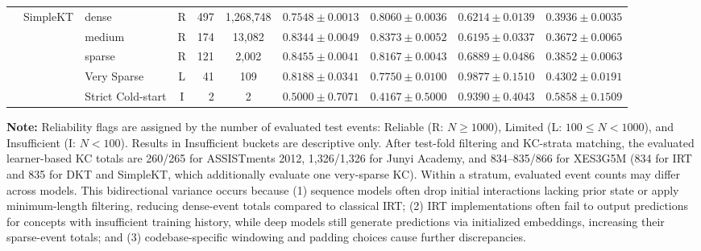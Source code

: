\begin{table}[tbp]
{\begin{tabular}{lllcrccccc}
 & SimpleKT & dense & R & 497 & 1,268,748 & $0.7548 \pm 0.0013$ & $0.8060 \pm 0.0036$ & $0.6214 \pm 0.0139$ & $0.3936 \pm 0.0035$ \\
 &  & medium & R & 174 & 13,082 & $0.8344 \pm 0.0049$ & $0.8373 \pm 0.0052$ & $0.6195 \pm 0.0337$ & $0.3672 \pm 0.0065$ \\
 &  & sparse & R & 121 & 2,002 & $0.8455 \pm 0.0041$ & $0.8167 \pm 0.0043$ & $0.6889 \pm 0.0486$ & $0.3852 \pm 0.0063$ \\
 &  & Very Sparse & L & 41 & 109 & $0.8188 \pm 0.0341$ & $0.7750 \pm 0.0100$ & $0.9877 \pm 0.1510$ & $0.4302 \pm 0.0191$ \\
 &  & Strict Cold-start & I & 2 & 2 & $0.5000 \pm 0.7071$ & $0.4167 \pm 0.5000$ & $0.9390 \pm 0.4043$ & $0.5858 \pm 0.1509$ \\
\bottomrule

\end{tabular}%
}

\vspace{1ex}
{\scriptsize \textbf{Note:} Reliability flags are assigned by the number of evaluated test events: Reliable (R: $N \ge 1000$), Limited (L: $100 \le N < 1000$), and Insufficient (I: $N < 100$). Results in Insufficient buckets are descriptive only. After test-fold filtering and KC-strata matching, the evaluated learner-based KC totals are 260/265 for ASSISTments 2012, 1,326/1,326 for Junyi Academy, and 834--835/866 for XES3G5M (834 for IRT and 835 for DKT and SimpleKT, which additionally evaluate one very-sparse KC). Within a stratum, evaluated event counts may differ across models. This bidirectional variance occurs because (1) sequence models often drop initial interactions lacking prior state or apply minimum-length filtering, reducing dense-event totals compared to classical IRT; (2) IRT implementations often fail to output predictions for concepts with insufficient training history, while deep models still generate predictions via initialized embeddings, increasing their sparse-event totals; and (3) codebase-specific windowing and padding choices cause further discrepancies.\par}

\end{table}
